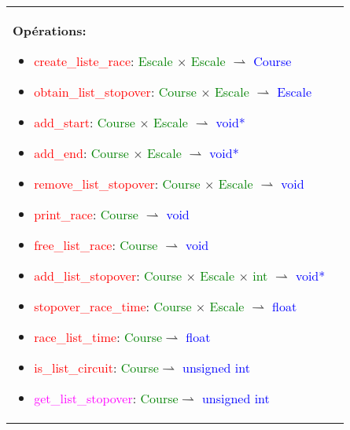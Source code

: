 \documentclass[a4paper, 11pt, oneside]{article}
\begin{document}
\begin{tabular}{|p{17cm}|c}
				\textbf{Opérations\footnotemark{}:}
					\begin{itemize}
						\item[] \textcolor{red}{create\_liste\_race}: \textcolor{green}{Escale} $\times$ \textcolor{green}{Escale} $\rightharpoonup$ \textcolor{blue}{Course}
						\item[] \textcolor{red}{obtain\_list\_stopover}: \textcolor{green}{Course} $\times$ \textcolor{green}{Escale} $\rightharpoonup$ \textcolor{blue}{Escale}
						\item[] \textcolor{red}{add\_start}: \textcolor{green}{Course} $\times$ \textcolor{green}{Escale} $\rightharpoonup$ \textcolor{blue}{void*}
						\item[] \textcolor{red}{add\_end}: \textcolor{green}{Course} $\times$ \textcolor{green}{Escale} $\rightharpoonup$ \textcolor{blue}{void*}
						\item[] \textcolor{red}{remove\_list\_stopover}: \textcolor{green}{Course} $\times$ \textcolor{green}{Escale} $\rightharpoonup$ \textcolor{blue}{void}
						\item[] \textcolor{red}{print\_race}: \textcolor{green}{Course} $\rightharpoonup$ \textcolor{blue}{void}
						\item[] \textcolor{red}{free\_list\_race}: \textcolor{green}{Course} $\rightharpoonup$ \textcolor{blue}{void}
						\item[] \textcolor{red}{add\_list\_stopover}: \textcolor{green}{Course} $\times$ \textcolor{green}{Escale} $\times$ \textcolor{green}{int} $\rightharpoonup$ \textcolor{blue}{void*}
						\item[] \textcolor{red}{stopover\_race\_time}: \textcolor{green}{Course} $\times$ \textcolor{green}{Escale} $\rightharpoonup$ \textcolor{blue}{float}
						\item[] \textcolor{red}{race\_list\_time}: \textcolor{green}{Course}$\rightharpoonup$ \textcolor{blue}{float}
						\item[] \textcolor{red}{is\_list\_circuit}: \textcolor{green}{Course}$\rightharpoonup$ \textcolor{blue}{unsigned int}
						\item[] \textcolor{magenta}{get\_list\_stopover}: \textcolor{green}{Course}$\rightharpoonup$ \textcolor{blue}{unsigned int}
					\end{itemize}
				

\end{tabular}
\end{document}
